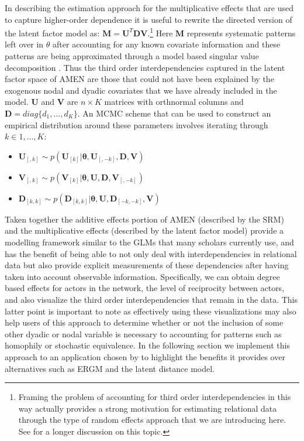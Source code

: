 In describing the estimation approach for the multiplicative effects that are used to capture higher-order dependence it is useful to rewrite the directed version of the latent factor model as: $\mathbf{M} = \mathbf{U}^{T} \mathbf{D} \mathbf{V}$.\footnote{Framing the problem of accounting for third order interdependencies in this way actually provides a strong motivation for estimating relational data through the type of random effects approach that we are introducing here. See \citet{hoff:2009} for a longer discussion on this topic.} Here $\mathbf{M}$ represents systematic patterns left over in $\theta$ after accounting for any known covariate information and these patterns are being approximated through a model based singular value decomposition \citep{hoff:2009}. Thus the third order interdependencies captured in the latent factor space of AMEN are those that could not have been explained by the exogenous nodal and dyadic covariates that we have already included in the model. $\mathbf{U}$ and $\mathbf{V}$ are $n \times K$ matrices with orthnormal columns and $\mathbf{D}=diag\{d_{1}, \ldots, d_{K}\}$. An MCMC scheme that can be used to construct an empirical distribution around these parameters involves iterating through $k \in 1, \ldots, K$:

\begin{itemize}
	\item $\mathbf{U}_{[,k]} \sim p( \mathbf{U}_{[k]} | \bm\theta , \mathbf{U}_{[,-k]}, \mathbf{D}, \mathbf{V} )$
	\item $\mathbf{V}_{[,k]} \sim p( \mathbf{V}_{[k]} | \bm\theta , \mathbf{U}, \mathbf{D}, \mathbf{V}_{[,-k]} )$
	\item $\mathbf{D}_{[k,k]} \sim p( \mathbf{D}_{[k,k]} | \bm\theta , \mathbf{U}, \mathbf{D}_{[-k,-k]}, \mathbf{V} )$
\end{itemize}

Taken together the additive effects portion of AMEN (described by the SRM) and the multiplicative effects (described by the latent factor model) provide a modelling framework similar to the GLMs that many scholars currently use, and has the benefit of being able to not only deal with interdependencies in relational data but also provide explicit measurements of these dependencies after having taken into account observable information. Specifically, we can obtain degree based effects for actors in the network, the level of reciprocity between actors, and also visualize the third order interdependencies that remain in the data. This latter point is important to note as effectively using these visualizations may also help users of this approach to determine whether or not the inclusion of some other dyadic or nodal variable is necessary to accounting for patterns such as homophily or stochastic equivalence. In the following section we implement this approach to an application chosen by \citet{cranmer:etal:2016} to highlight the benefits it provides over alternatives such as ERGM and the latent distance model.

